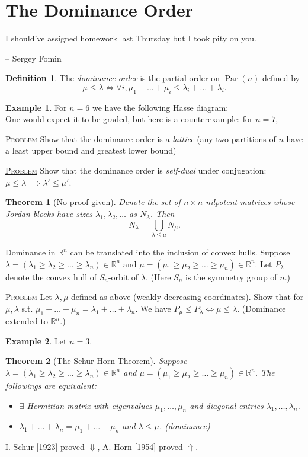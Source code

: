 \documentclass{report}
\newcommand{\R}{\mathbb{R}}
\def \Par {\operatorname{Par}}
\newcommand{\fancyem}[1]{\underline{\textsc{#1}}}
\newtheorem{theorem}{Theorem}[section]
\theoremstyle{definition}
\newtheorem{definition}{Definition}[section]
\newtheorem{example}{Example}[section]
\theoremstyle{remark}
\numberwithin{equation}{section}
\begin{document}
\section{The Dominance Order}
\epigraph{I should've assigned homework last Thursday but I took pity on you.}{-- \textup{Sergey Fomin}}
\begin{definition}
    The \emph{dominance order} is the partial order on $\Par(n)$ defined by
    \[
        \mu \leq \lambda \iff \forall i, \mu_1 + \ldots + \mu_i \leq \lambda_i + \ldots + \lambda_i.    
    \]
\end{definition}
\begin{example}
    For $n = 6$ we have the following Hasse diagram:
    \[\]
    One would expect it to be graded, but here is a counterexample: for $n = 7$,
\end{example}
\fancyem{Problem} Show that the dominance order is a \emph{lattice} (any two partitions of $n$ have a least upper bound and greatest lower bound)

\fancyem{Problem} Show that the dominance order is \emph{self-dual} under conjugation: $\mu \leq \lambda \implies \lambda' \leq \mu'$.

\begin{theorem}[No proof given]
    Denote the set of $n \times n$ nilpotent matrices whose Jordan blocks have sizes $\lambda_1, \lambda_2, \ldots$ as $N_\lambda$. Then
    \[
    \overline{N_\lambda} = \bigcup_{\lambda \leq \mu} N_\mu.    
    \]
\end{theorem}

Dominance in $\R^n$ can be translated into the inclusion of convex hulls. Suppose $\lambda = (\lambda_1 \geq \lambda_2 \geq \ldots \geq \lambda_n) \in \R^n$ and $\mu = (\mu_1 \geq \mu_2 \geq \ldots \geq \mu_n) \in \R^n$. Let $P_\lambda$ denote the convex hull of $S_n$-orbit of $\lambda$. (Here $S_n$ is the symmetry group of $n$.)

\fancyem{Problem} Let $\lambda, \mu$ defined as above (weakly decreasing coordinates). Show that for $\mu, \lambda$ s.t. $\mu_1 + \ldots + \mu_n = \lambda_1 + \ldots + \lambda_n$. We have $P_\mu \leq P_\lambda \iff \mu \leq \lambda$. (Dominance extended to $\R^n$.)

\begin{example}
    Let $n = 3$.
\end{example}

\begin{theorem}[The Schur-Horn Theorem]
    Suppose $\lambda = (\lambda_1 \geq \lambda_2 \geq \ldots \geq \lambda_n) \in \R^n$ and $\mu = (\mu_1 \geq \mu_2 \geq \ldots \geq \mu_n) \in \R^n$. The followings are equivalent: \begin{itemize}
        \item $\exists$ Hermitian matrix with eigenvalues $\mu_1, \ldots, \mu_n$ and diagonal entries $\lambda_1, \ldots, \lambda_n$.
        \item $\lambda_1 + \ldots + \lambda_n = \mu_1 + \ldots + \mu_n$ and $\lambda \leq \mu$. (dominance)
    \end{itemize}
\end{theorem}
I. Schur [1923] proved $\Downarrow$, A. Horn [1954] proved $\Uparrow$.
\end{document}
